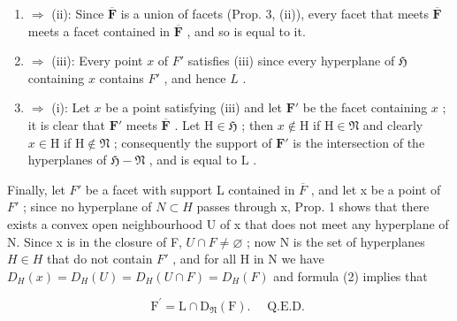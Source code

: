 \begin{enumerate}
\def\labelenumi{(\roman{enumi})}
\item
  \(\Longrightarrow\) (ii): Since \(\overline{\mathbf{F}}\) is a union of facets (Prop. 3, (ii)), every facet that meets \(\overline{\mathbf{F}}\) meets a facet contained in \(\overline{\mathbf{F}}\) , and so is equal to it.
\item
  \(\Longrightarrow\) (iii): Every point \(x\) of \(F'\) satisfies (iii) since every hyperplane of \(\mathfrak{H}\) containing \(x\) contains \(F'\) , and hence \(L\) .
\item
  \(\Longrightarrow\) (i): Let \(x\) be a point satisfying (iii) and let \(\mathbf{F}'\) be the facet containing \(x\) ; it is clear that \(\mathbf{F}'\) meets \(\overline{\mathbf{F}}\) . Let \(\mathrm{H} \in \mathfrak{H}\) ; then \(x \notin \mathrm{H}\) if \(\mathrm{H} \in \mathfrak{N}\) and clearly \(x \in \mathrm{H}\) if \(\mathrm{H} \notin \mathfrak{N}\) ; consequently the support of \(\mathbf{F}'\) is the intersection of the hyperplanes of \(\mathfrak{H} - \mathfrak{N}\) , and is equal to \(\mathrm{L}\) .
\end{enumerate}

Finally, let \(F'\) be a facet with support L contained in \(\overline{F}\) , and let x be a point of \(F'\) ; since no hyperplane of \(N \subset H\) passes through x, Prop. 1 shows that there exists a convex open neighbourhood U of x that does not meet any hyperplane of N. Since x is in the closure of F, \(U \cap F \neq \varnothing\) ; now N is the set of hyperplanes \(H \in H\) that do not contain \(F'\) , and for all H in N we have \(D_{H}(x) = D_{H}(U) = D_{H}(U \cap F) = D_{H}(F)\) and formula (2) implies that

\[
\mathrm{F} ^ {\prime} = \mathrm{L} \cap \mathrm{D} _ {\mathfrak {N}} (\mathrm{F}). \quad \text { Q.E.D. }
\]

